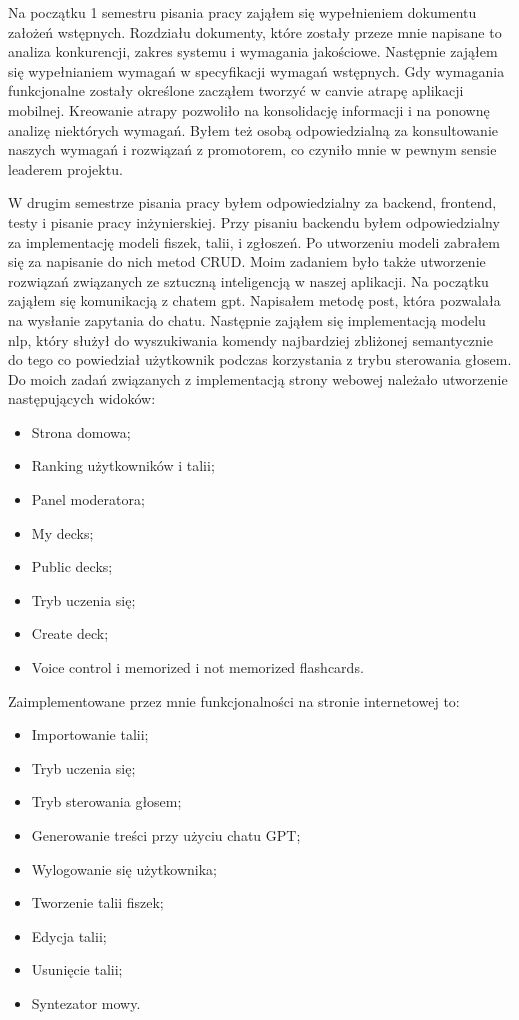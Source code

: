 Na początku 1 semestru pisania pracy zająłem się wypełnieniem dokumentu założeń wstępnych.
Rozdziału dokumenty, które zostały przeze mnie napisane to analiza konkurencji, zakres systemu i wymagania jakościowe.
Następnie zająłem się wypełnianiem wymagań w specyfikacji wymagań wstępnych.
Gdy wymagania funkcjonalne zostały określone zacząłem tworzyć w canvie atrapę aplikacji mobilnej.
Kreowanie atrapy pozwoliło na konsolidację informacji i na ponownę analizę niektórych wymagań.
Byłem też osobą odpowiedzialną za konsultowanie naszych wymagań i rozwiązań z promotorem, co czyniło mnie w pewnym
sensie leaderem projektu.
\par W drugim semestrze pisania pracy byłem odpowiedzialny za backend, frontend, testy i pisanie pracy
inżynierskiej. Przy pisaniu backendu byłem odpowiedzialny za implementację modeli fiszek, talii, i zgłoszeń.
Po utworzeniu modeli zabrałem się za napisanie do nich metod CRUD.
Moim zadaniem było także utworzenie rozwiązań związanych ze sztuczną inteligencją w naszej aplikacji.
Na początku zająłem się komunikacją z chatem gpt. Napisałem metodę post, która pozwalała na wysłanie zapytania do chatu.
Następnie zająłem się implementacją modelu nlp, który służył do wyszukiwania komendy najbardziej zbliżonej semantycznie
do tego co powiedział użytkownik podczas korzystania z trybu sterowania głosem. Do moich zadań związanych z
implementacją strony webowej należało utworzenie następujących widoków:
\begin{itemize}
    \item Strona domowa;
    \item Ranking użytkowników i talii;
    \item Panel moderatora;
    \item My decks;
    \item Public decks;
    \item Tryb uczenia się;
    \item Create deck;
    \item Voice control i memorized i not memorized flashcards.
\end{itemize}

Zaimplementowane przez mnie funkcjonalności na stronie internetowej to:

\begin{itemize}
    \item Importowanie talii;
    \item Tryb uczenia się;
    \item Tryb sterowania głosem;
    \item Generowanie treści przy użyciu chatu GPT;
    \item Wylogowanie się użytkownika;
    \item Tworzenie talii fiszek;
    \item Edycja talii;
    \item Usunięcie talii;
    \item Syntezator mowy.
\end{itemize}

